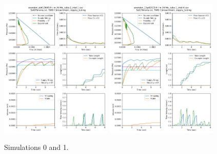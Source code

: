 \documentclass[letterpaper]{article}
\begin{document}
\begin{figure}[h]\centering
\includegraphics[width=0.475\textwidth]{9Files_Sim_outputs/Set0redo-26-Aug.png}
\includegraphics[width=0.475\textwidth]{9Files_Sim_outputs/Set1redo22-Aug.png}
\caption{Simulations 0 and 1.}
\end{figure}
\end{document}
